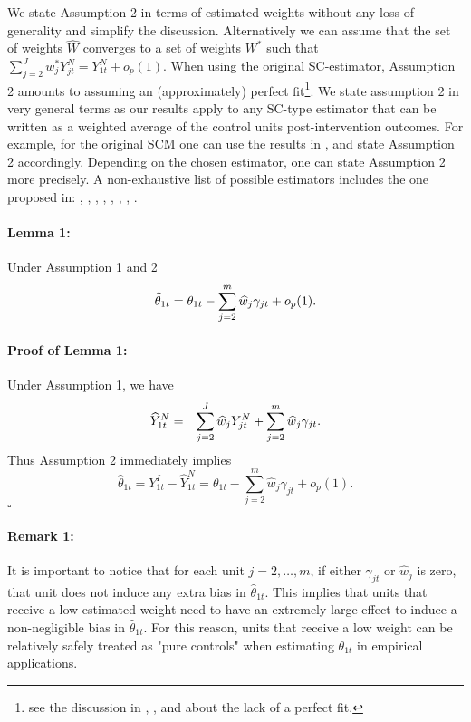 We state Assumption 2 in terms of estimated weights without any loss of generality and simplify the discussion. Alternatively we can assume that the set of weights $\widehat{W}$ converges to a set of weights $W^*$ such that $\sum_{j=2}^J w^*_{j}{Y_{jt}^N}= Y_{1t}^N+ o_p(1)$. When using the original SC-estimator, Assumption 2 amounts to assuming an (approximately) perfect fit\footnote{see the discussion in \citet{Aba2020}, \citet{Fer2019}, and \cite{Pow2022} about the lack of a perfect fit.}. We state assumption 2 in very general terms as our results apply to any SC-type estimator that can be written as a weighted average of the control units post-intervention outcomes. For example, for the original SCM one can use the results in  \cite{Zha2022}, and state Assumption 2 accordingly.  Depending on the chosen estimator, one can state Assumption 2 more precisely. A non-exhaustive list of possible estimators includes the one proposed in: \citealt{Aba2019}, \citealt{Amj2018}, \citealt{Ben2020}, \citealt{Ben2019}, \citealt{Dou2016}, \citealt{Fer2019}, \citealt{Kel2020},  \citealt{Xu2017}.  
  

\paragraph{Lemma 1:} Under Assumption 1 and 2 
\begin{equation}
\widehat{\theta}_{1t}= \theta_{1t} - \sum_{j=2}^m \widehat{w}_{j}{\gamma_{jt}}+o_p(1)\notag.
\end{equation}


\paragraph{Proof of Lemma 1:}
Under Assumption 1, we have
\begin{eqnarray}
\widehat{Y}_{1t}^N&=& \sum_{j=2}^J \widehat{w}_{j}Y^N_{jt}+\sum_{j=2}^m \widehat{w}_{j}{\gamma_{jt}}\notag.
\end{eqnarray}
Thus Assumption 2 immediately implies
$$
\widehat{\theta}_{1t} ={Y}_{1t}^I- \widehat{Y}_{1t}^N= \theta_{1t} - \sum_{j=2}^m \widehat{w}_{j}{\gamma_{jt}}+o_p(1).
$$
$\square$


\paragraph{Remark 1:} It is important to notice that for each unit $j=2,\ldots,m$, if either  $\gamma_{jt}$ or $\widehat{w}_{j}$ is zero, that unit does not induce any extra bias in $\widehat{\theta}_{1t}$. This implies that units that receive a low estimated weight need to have an extremely large effect to induce a non-negligible bias in $\widehat{\theta}_{1t}$. For this reason, units that receive a low weight can be relatively safely treated as "pure controls" when estimating $\theta_{1t}$ in empirical applications.

